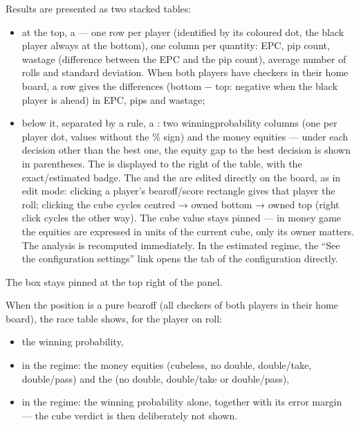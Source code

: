\documentclass[letterpaper,10pt,english]{sphinxmanual}
\begin{document}
\sphinxAtStartPar
Results are presented as two stacked tables:
\begin{itemize}
\item {} 
\sphinxAtStartPar
at the top, a  — one row per player (identified by its coloured dot, the black player always at the bottom), one column per quantity: EPC, pip count, wastage (difference between the EPC and the pip count), average number of rolls and standard deviation. When both players have checkers in their home board, a  row gives the  differences (bottom − top: negative when the black player is ahead) in EPC, pips and wastage;

\item {} 
\sphinxAtStartPar
below it, separated by a rule, a : two winning\sphinxhyphen{}probability columns (one per player dot, values without the \% sign) and the money equities — under each decision other than the best one, the equity gap to the best decision is shown in parentheses. The  is displayed to the right of the table, with the exact/estimated badge. The  and the  are edited directly on the board, as in edit mode: clicking a player’s bearoff/score rectangle gives that player the roll; clicking the cube cycles centred → owned bottom → owned top (right click cycles the other way). The cube value stays pinned — in money game the equities are expressed in units of the current cube, only its owner matters. The analysis is recomputed immediately. In the estimated regime, the “See the configuration settings” link opens the  tab of the configuration directly.

\end{itemize}

\sphinxAtStartPar
The  box stays pinned at the top right of the panel.

\sphinxAtStartPar
When the position is a pure bearoff (all checkers of both players in their home board), the race table shows, for the player on roll:
\begin{itemize}
\item {} 
\sphinxAtStartPar
the winning probability,

\item {} 
\sphinxAtStartPar
in the  regime: the money equities (cubeless, no double, double/take, double/pass) and the  (no double, double/take or double/pass),

\item {} 
\sphinxAtStartPar
in the  regime: the winning probability alone, together with its error margin — the cube verdict is then deliberately not shown.

\end{itemize}
\end{document}
